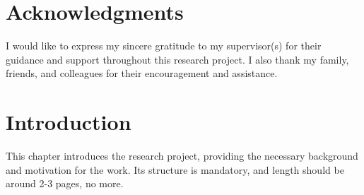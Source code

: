 \documentclass[12pt, a4paper]{report}
\begin{document}


\begin{abstract}
This is the abstract of your Master 2 report. 
It should provide a concise summary of the context, objectives, methodology, key results, and conclusions of your research. 
The abstract should be self-contained and typically between 150-300 words.
The report size should be 30 pages to 35 pages maximum, from chapters 1 to 5.
Extra pages will not be considered during the reviewing process, and points removed from final mark!
\end{abstract}

\clearpage


\chapter*{Acknowledgments}

I would like to express my sincere gratitude to my supervisor(s) for their guidance and support throughout this research project. 
I also thank my family, friends, and colleagues for their encouragement and assistance.

\clearpage


\tableofcontents

\clearpage

\setcounter{page}{1}


\chapter{Introduction}
\label{chap:introduction}

This chapter introduces the research project, providing the necessary background and motivation for the work.
Its structure is mandatory, and length should be around 2-3 pages, no more.
\end{document}
